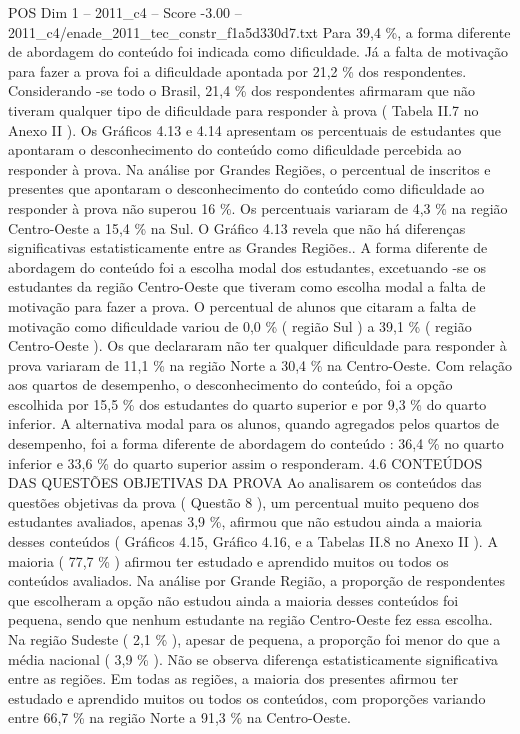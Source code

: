 \begin{textsample}{POS Dim 1 – 2011\_c4 – Score -3.00 – 2011\_c4/enade\_2011\_tec\_constr\_f1a5d330d7.txt}
Para 39,4 \%, a forma diferente de abordagem do conteúdo foi indicada como dificuldade.
Já a falta de motivação para fazer a prova foi a dificuldade apontada por 21,2 \% dos respondentes.
Considerando -se todo o Brasil, 21,4 \% dos respondentes afirmaram que não tiveram qualquer tipo de dificuldade para responder à prova ( Tabela II.7 no Anexo II ).
Os Gráficos 4.13 e 4.14 apresentam os percentuais de estudantes que apontaram o desconhecimento do conteúdo como dificuldade percebida ao responder à prova.
Na análise por Grandes Regiões, o percentual de inscritos e presentes que apontaram o desconhecimento do conteúdo como dificuldade ao responder à prova não superou 16 \%.
Os percentuais variaram de 4,3 \% na região Centro-Oeste a 15,4 \% na Sul.
O Gráfico 4.13 revela que não há diferenças significativas estatisticamente entre as Grandes Regiões..
A forma diferente de abordagem do conteúdo foi a escolha modal dos estudantes, excetuando -se os estudantes da região Centro-Oeste que tiveram como escolha modal a falta de motivação para fazer a prova.
O percentual de alunos que citaram a falta de motivação como dificuldade variou de 0,0 \% ( região Sul ) a 39,1 \% ( região Centro-Oeste ).
Os que declararam não ter qualquer dificuldade para responder à prova variaram de 11,1 \% na região Norte a 30,4 \% na Centro-Oeste.
Com relação aos quartos de desempenho, o desconhecimento do conteúdo, foi a opção escolhida por 15,5 \% dos estudantes do quarto superior e por 9,3 \% do quarto inferior.
A alternativa modal para os alunos, quando agregados pelos quartos de desempenho, foi a forma diferente de abordagem do conteúdo : 36,4 \% no quarto inferior e 33,6 \% do quarto superior assim o responderam. 4.6 CONTEÚDOS DAS QUESTÕES OBJETIVAS DA PROVA Ao analisarem os conteúdos das questões objetivas da prova ( Questão 8 ), um percentual muito pequeno dos estudantes avaliados, apenas 3,9 \%, afirmou que não estudou ainda a maioria desses conteúdos ( Gráficos 4.15, Gráfico 4.16, e a Tabelas II.8 no Anexo II ).
A maioria ( 77,7 \% ) afirmou ter estudado e aprendido muitos ou todos os conteúdos avaliados.
Na análise por Grande Região, a proporção de respondentes que escolheram a opção não estudou ainda a maioria desses conteúdos foi pequena, sendo que nenhum estudante na região Centro-Oeste fez essa escolha.
Na região Sudeste ( 2,1 \% ), apesar de pequena, a proporção foi menor do que a média nacional ( 3,9 \% ).
Não se observa diferença estatisticamente significativa entre as regiões.
Em todas as regiões, a maioria dos presentes afirmou ter estudado e aprendido muitos ou todos os conteúdos, com proporções variando entre 66,7 \% na região Norte a 91,3 \% na Centro-Oeste.

\end{textsample}
